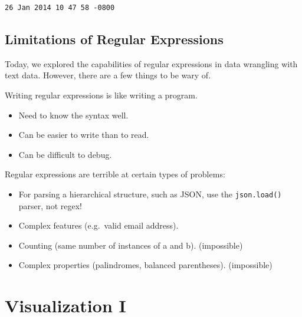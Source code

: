 \documentclass[
  letterpaper,
  DIV=11,
  numbers=noendperiod]{scrreprt}
\providecommand{\tightlist}{%
  \setlength{\itemsep}{0pt}\setlength{\parskip}{0pt}}\usepackage{longtable,booktabs,array}
\begin{document}
\begin{verbatim}
26 Jan 2014 10 47 58 -0800
\end{verbatim}

\hypertarget{limitations-of-regular-expressions}{%
\section{Limitations of Regular
Expressions}\label{limitations-of-regular-expressions}}

Today, we explored the capabilities of regular expressions in data
wrangling with text data. However, there are a few things to be wary of.

Writing regular expressions is like writing a program.

\begin{itemize}
\tightlist
\item
  Need to know the syntax well.
\item
  Can be easier to write than to read.
\item
  Can be difficult to debug.
\end{itemize}

Regular expressions are terrible at certain types of problems:

\begin{itemize}
\tightlist
\item
  For parsing a hierarchical structure, such as JSON, use the
  \texttt{json.load()} parser, not regex!
\item
  Complex features (e.g.~valid email address).
\item
  Counting (same number of instances of a and b). (impossible)
\item
  Complex properties (palindromes, balanced parentheses). (impossible)
\end{itemize}


\hypertarget{visualization-i}{%
\chapter{Visualization I}\label{visualization-i}}
\end{document}
